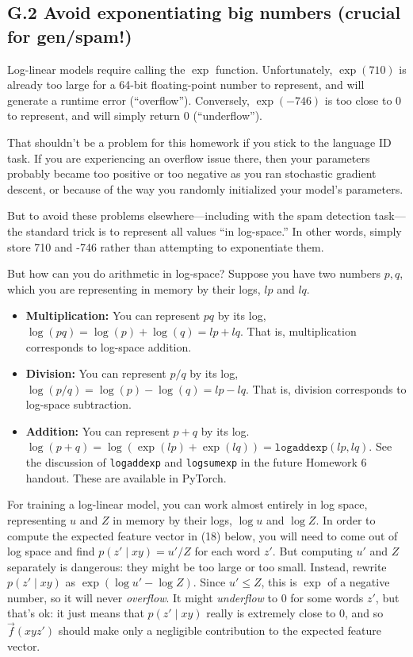\subsection*{G.2 Avoid exponentiating big numbers (crucial for gen/spam!)}
Log-linear models require calling the $\exp$ function. Unfortunately, $\exp(710)$ is already too large for a 64-bit floating-point number to represent, and will generate a runtime error (“overflow”). Conversely, $\exp(-746)$ is too close to 0 to represent, and will simply return 0 (“underflow”).  

That shouldn’t be a problem for this homework if you stick to the language ID task. If you are experiencing an overflow issue there, then your parameters probably became too positive or too negative as you ran stochastic gradient descent, or because of the way you randomly initialized your model’s parameters.  

But to avoid these problems elsewhere—including with the spam detection task—the standard trick is to represent all values “in log-space.” In other words, simply store 710 and -746 rather than attempting to exponentiate them.

But how can you do arithmetic in log-space? Suppose you have two numbers $p, q$, which you are representing in memory by their logs, $lp$ and $lq$.  

\begin{itemize}
    \item \textbf{Multiplication:} You can represent $pq$ by its log, $\log(pq) = \log(p) + \log(q) = lp + lq$. That is, multiplication corresponds to log-space addition.

    \item \textbf{Division:} You can represent $p/q$ by its log, $\log(p/q) = \log(p) - \log(q) = lp - lq$. That is, division corresponds to log-space subtraction.

    \item \textbf{Addition:} You can represent $p+q$ by its log. $\log(p+q) = \log(\exp(lp)+\exp(lq)) = \texttt{logaddexp}(lp,lq)$. See the discussion of \texttt{logaddexp} and \texttt{logsumexp} in the future Homework 6 handout. These are available in PyTorch.
\end{itemize}

For training a log-linear model, you can work almost entirely in log space, representing $u$ and $Z$ in memory by their logs, $\log u$ and $\log Z$. In order to compute the expected feature vector in (18) below, you will need to come out of log space and find $p(z' \mid xy) = u'/Z$ for each word $z'$. But computing $u'$ and $Z$ separately is dangerous: they might be too large or too small. Instead, rewrite $p(z' \mid xy)$ as $\exp(\log u' - \log Z)$. Since $u' \leq Z$, this is $\exp$ of a negative number, so it will never \emph{overflow}. It might \emph{underflow} to 0 for some words $z'$, but that’s ok: it just means that $p(z' \mid xy)$ really is extremely close to 0, and so $\vec{f}(xyz')$ should make only a negligible contribution to the expected feature vector.

